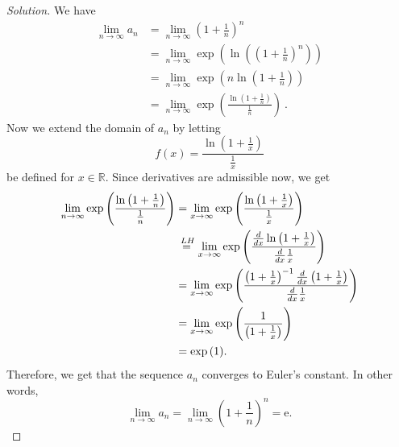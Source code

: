 \documentclass[compacto,10pt,comentarios]{aleph-notas}
\newcommand*\Heq{\ensuremath{\overset{\kern2pt LH}{=}}}
\begin{document}
\begin{proof}[Solution]
    We have
    \begin{align*}
        \lim_{n \to \infty} a_n & = \lim_{n \to \infty} \left( 1 + \frac{1}{n} \right)^{n} \\
        & = \lim_{n \to \infty} \exp{ \left( \ln\left(\left( 1 + \frac{1}{n} \right)^{n}\right) \right)} \\
        & = \lim_{n \to \infty} \exp{ \left( n \ln\left(1 + \frac{1}{n} \right) \right)} \\
        & = \lim_{n \to \infty} \exp{ \left( \frac{\ln\left(1 + \frac{1}{n} \right)}{\frac{1}{n}} \right)} ~ .
    \end{align*}
    Now we extend the domain of $a_n$ by letting
    $$
        f(x) = \frac{\ln\left( 1 + \frac{1}{x} \right)}{\frac{1}{x}}
    $$
    be defined for $x \in \mathbb{R}$. Since derivatives are admissible now, we get
    \begin{align*}
        \lim_{n \to \infty} \exp{ \left( \frac{\ln\left(1 + \frac{1}{n} \right)}{\frac{1}{n}} \right)}
        & = \lim_{x \to \infty} \exp{ \left( \frac{\ln\left(1 + \frac{1}{x} \right)}{\frac{1}{x}} \right)} \\
        & \Heq \lim_{x \to \infty} \exp{ \left( \frac{\frac{d}{dx} \ln\left(1 + \frac{1}{x} \right)}{ \frac{d}{dx} \frac{1}{x}} \right)} \\
        & = \lim_{x \to \infty} \exp{ \left( \frac{ \left(1 + \frac{1}{x} \right)^{-1} \frac{d}{dx} \left(1 + \frac{1}{x} \right)}{ \frac{d}{dx} \frac{1}{x}} \right)} \\
        & = \lim_{x \to \infty} \exp{ \left( \frac{ 1}{\left(1 + \frac{1}{x} \right)} \right)} \\ 
        & = \exp{\left(1\right)}.
    \end{align*}
    Therefore, we get that the sequence $a_n$ converges to Euler's constant. In other words,
    $$
        \lim_{n \to \infty} a_n = \lim_{n \to \infty} \left( 1 + \frac{1}{n} \right)^{n} = \mathrm{e} .
    $$
\end{proof}
\end{document}
